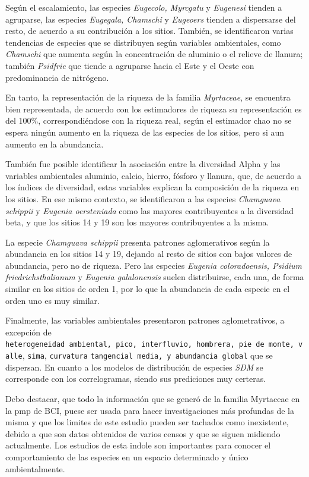 \documentclass[11pt,]{article}
\begin{document}
Según el escalamiento, las especies \emph{Eugecolo, Myrcgatu} y
\emph{Eugenesi} tienden a agruparse, las especies \emph{Eugegala,
Chamschi} y \emph{Eugeoers} tienden a dispersarse del resto, de acuerdo
a su contribución a los sitios. También, se identificaron varias
tendencias de especies que se distribuyen según variables ambientales,
como \emph{Chamschi} que aumenta según la concentración de aluminio o el
relieve de llanura; también \emph{Psidfrie} que tiende a agruparse hacia
el Este y el Oeste con predominancia de nitrógeno.

En tanto, la representación de la riqueza de la familia
\emph{Myrtaceae}, se encuentra bien representada, de acuerdo con los
estimadores de riqueza su representación es del 100\%, correspondiéndose
con la riqueza real, según el estimador chao no se espera ningún aumento
en la riqueza de las especies de los sitios, pero si aun aumento en la
abundancia.

También fue posible identificar la asociación entre la diversidad Alpha
y las variables ambientales aluminio, calcio, hierro, fósforo y llanura,
que, de acuerdo a los índices de diversidad, estas variables explican la
composición de la riqueza en los sitios. En ese mismo contexto, se
identificaron a las especies \emph{Chamguava schippii} y \emph{Eugenia
oersteniada} como las mayores contribuyentes a la diversidad beta, y que
los sitios 14 y 19 son los mayores contribuyentes a la misma.

La especie \emph{Chamguava schippii} presenta patrones aglomerativos
según la abundancia en los sitios 14 y 19, dejando al resto de sitios
con bajos valores de abundancia, pero no de riqueza. Pero las especies
\emph{Eugenia coloradoensis, Psidium friedrichsthalianum} y
\emph{Eugenia galalonensis} suelen distribuirse, cada una, de forma
similar en los sitios de orden 1, por lo que la abundancia de cada
especie en el orden uno es muy similar.

Finalmente, las variables ambientales presentaron patrones
aglometrativos, a excepción de
\texttt{heterogeneidad\ ambiental,\ pico,\ interfluvio,\ hombrera,\ pie\ de\ monte,\ valle},
\texttt{sima}, \texttt{curvatura}
\texttt{tangencial\ media,\ y\ abundancia\ global} que se dispersan. En
cuanto a los modelos de distribución de especies \emph{SDM} se
corresponde con los correlogramas, siendo sus prediciones muy certeras.

Debo destacar, que todo la información que se generó de la familia
Myrtaceae en la pmp de BCI, puese ser usada para hacer investigaciones
más profundas de la misma y que los limites de este estudio pueden ser
tachados como inexistente, debido a que son datos obtenidos de varios
censos y que se siguen midiendo actualmente. Los estudios de esta indole
son importantes para conocer el comportamiento de las especies en un
espacio determinado y único ambientalmente.
\end{document}
